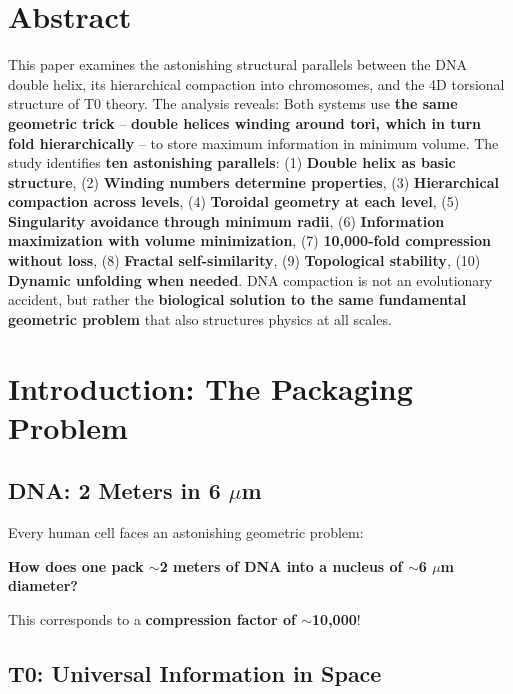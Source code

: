 \section*{Abstract}
		This paper examines the astonishing structural parallels between the DNA double helix, its hierarchical compaction into chromosomes, and the 4D torsional structure of T0 theory. The analysis reveals: Both systems use \textbf{the same geometric trick} -- \textbf{double helices winding around tori, which in turn fold hierarchically} -- to store maximum information in minimum volume. The study identifies \textbf{ten astonishing parallels}: (1) \textbf{Double helix as basic structure}, (2) \textbf{Winding numbers determine properties}, (3) \textbf{Hierarchical compaction across levels}, (4) \textbf{Toroidal geometry at each level}, (5) \textbf{Singularity avoidance through minimum radii}, (6) \textbf{Information maximization with volume minimization}, (7) \textbf{10,000-fold compression without loss}, (8) \textbf{Fractal self-similarity}, (9) \textbf{Topological stability}, (10) \textbf{Dynamic unfolding when needed}. DNA compaction is not an evolutionary accident, but rather the \textbf{biological solution to the same fundamental geometric problem} that also structures physics at all scales.

	
	
	
	\section{Introduction: The Packaging Problem}
	
	\subsection{DNA: 2 Meters in 6 $\mu$m}
	
	Every human cell faces an astonishing geometric problem:
	
	\begin{center}
		
		\textbf{How does one pack $\sim$2 meters of DNA into a nucleus of $\sim$6 $\mu$m diameter?}
	\end{center}
	
	This corresponds to a \textbf{compression factor of $\sim$10,000}!
	
	\subsection{T0: Universal Information in Space}
	
